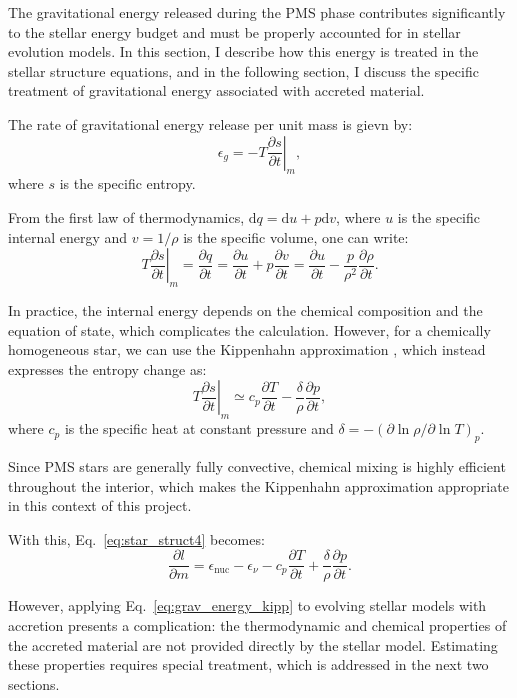 \documentclass[12pt,a4paper]{article}
\newcommand{\mr}{\mathrm}
\newcommand{\pfird}[2][]{\frac{\partial#1}{\partial#2}}
\newcommand{\dd}[1]{\mathrm{d}#1}
\begin{document}
The gravitational energy released during the PMS phase contributes significantly to the stellar energy budget and must be properly accounted for in stellar evolution models. In this section, I describe how this energy is treated in the stellar structure equations, and in the following section, I discuss the specific treatment of gravitational energy associated with accreted material.

The rate of gravitational energy release per unit mass is gievn by:
\begin{equation}
\epsilon_g = -T\left.\pfird[s]{t}\right|_m, \label{eq:grav_energy}
\end{equation}
where $s$ is the specific entropy.

From the first law of thermodynamics, $\dd{q} = \dd{u} + p\dd{v}$, where $u$ is the specific internal energy and $v = 1/\rho$ is the specific volume, one can write:
\begin{equation}
  T\left.\pfird[s]{t}\right|_m = \pfird[q]{t} = \pfird[u]{t} + p\pfird[v]{t} = \pfird[u]{t} - \frac{p}{\rho^2}\pfird[\rho]{t}.
\end{equation}

In practice, the internal energy depends on the chemical composition and the equation of state, which complicates the calculation. However, for a chemically homogeneous star, we can use the Kippenhahn approximation \parencite{KippenhahnEtAl2013}, which instead expresses the entropy change as:
\begin{equation}
  T\left.\pfird[s]{t}\right|_m \simeq c_p\pfird[T]{t} - \frac{\delta}{\rho}\pfird[p]{t},
\end{equation}
where $c_p$ is the specific heat at constant pressure and $\delta = -\left(\partial \ln \rho / \partial \ln T\right)_p$. 

Since PMS stars are generally fully convective, chemical mixing is highly efficient throughout the interior, which makes the Kippenhahn approximation appropriate in this context of this project.

With this, Eq.~\eqref{eq:star_struct4} becomes:
\begin{equation}
  \pfird[l]{m} = \epsilon_\mr{nuc} - \epsilon_\nu - c_p\pfird[T]{t} + \frac{\delta}{\rho}\pfird[p]{t}. \label{eq:grav_energy_kipp}
\end{equation}

However, applying Eq.~\eqref{eq:grav_energy_kipp} to evolving stellar models with accretion presents a complication: the thermodynamic and chemical properties of the accreted material are not provided directly by the stellar model. Estimating these properties requires special treatment, which is addressed in the next two sections.
\end{document}
